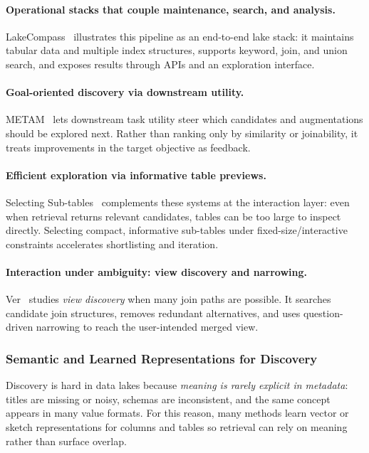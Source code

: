 \documentclass[sigconf,nonacm]{acmart}
\begin{document}
\paragraph{Operational stacks that couple maintenance, search, and analysis.}
LakeCompass~\cite{10.14778/3685800.3685880} illustrates this pipeline as an end-to-end lake stack: it maintains tabular data and multiple index structures, supports keyword, join, and union search, and exposes results through APIs and an exploration interface.

\paragraph{Goal-oriented discovery via downstream utility.}
METAM~\cite{10184845} lets downstream task utility steer which candidates and augmentations should be explored next. Rather than ranking only by similarity or joinability, it treats improvements in the target objective as feedback.

\paragraph{Efficient exploration via informative table previews.}
Selecting Sub-tables~\cite{10184535} complements these systems at the interaction layer: even when retrieval returns relevant candidates, tables can be too large to inspect directly. Selecting compact, informative sub-tables under fixed-size/interactive constraints accelerates shortlisting and iteration.

\paragraph{Interaction under ambiguity: view discovery and narrowing.}
Ver~\cite{10184768} studies \emph{view discovery} when many join paths are possible. It searches candidate join structures, removes redundant alternatives, and uses question-driven narrowing to reach the user-intended merged view.

\subsubsection{Semantic and Learned Representations for Discovery}
Discovery is hard in data lakes because \emph{meaning is rarely explicit in metadata}: titles are missing or noisy, schemas are inconsistent, and the same concept appears in many value formats. For this reason, many methods learn vector or sketch representations for columns and tables so retrieval can rely on meaning rather than surface overlap.
\end{document}
